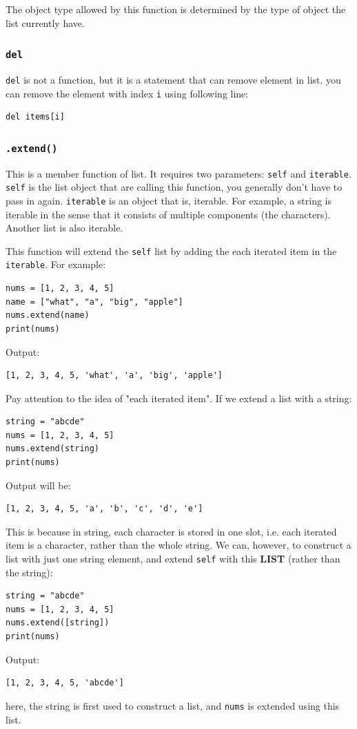 \documentclass[12pt]{book}
\begin{document}
The object type allowed by this function is determined by the type of object the list currently have.
\subsubsection{\texttt{del}}
\label{sec:orgbfcb95c}
\texttt{del} is not a function, but it is a statement that can remove element in list. you can remove the element with index \texttt{i} using following line:
\begin{verbatim}
del items[i]
\end{verbatim}
\subsubsection{\texttt{.extend()}}
\label{sec:org4c4389b}
This is a member function of list. It requires two parameters: \texttt{self} and \texttt{iterable}. \texttt{self} is the list object that are calling this function, you generally don't have to pass in again. \texttt{iterable} is an object that is, iterable. For example, a string is iterable in the sense that it consists of multiple components (the characters). Another list is also iterable.

This function will extend the \texttt{self} list by adding the each iterated item in the \texttt{iterable}. For example:
\begin{verbatim}
nums = [1, 2, 3, 4, 5]
name = ["what", "a", "big", "apple"]
nums.extend(name)
print(nums)
\end{verbatim}
Output:
\begin{verbatim}
[1, 2, 3, 4, 5, 'what', 'a', 'big', 'apple']
\end{verbatim}

Pay attention to the idea of "each iterated item". If we extend a list with a string:
\begin{verbatim}
string = "abcde"
nums = [1, 2, 3, 4, 5]
nums.extend(string)
print(nums)
\end{verbatim}
Output will be:
\begin{verbatim}
[1, 2, 3, 4, 5, 'a', 'b', 'c', 'd', 'e']
\end{verbatim}
This is because in string, each character is stored in one slot, i.e. each iterated item is a character, rather than the whole string. We can, however, to construct a list with just one string element, and extend \texttt{self} with this \textbf{LIST} (rather than the string):
\begin{verbatim}
string = "abcde"
nums = [1, 2, 3, 4, 5]
nums.extend([string])
print(nums)
\end{verbatim}
Output:
\begin{verbatim}
[1, 2, 3, 4, 5, 'abcde']
\end{verbatim}
here, the string is first used to construct a list, and \texttt{nums} is extended using this list.
\end{document}
